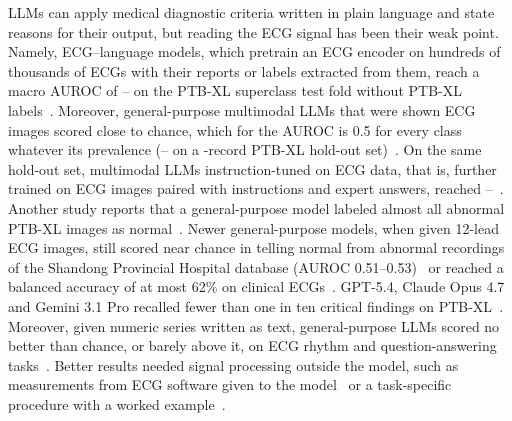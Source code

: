 LLMs can apply medical diagnostic criteria written in plain language and state reasons for their
output, but reading the ECG signal has been their weak point. Namely, ECG--language models, which pretrain an ECG encoder
on hundreds of thousands of ECGs with their reports or labels extracted from them, reach a macro AUROC of
\MinZeroShotAUROC--\BestZeroShotAUROC{} on the PTB-XL superclass test fold without PTB-XL
labels~\citep{liu2024merl,wang2025melp,pham2025dbeta,cai2025supreme}. Moreover, general-purpose multimodal LLMs that
were shown ECG images scored close to chance, which for the AUROC is 0.5 for every class whatever its prevalence
(\MinGeneralLLMAUROC--\BestGeneralLLMAUROC{} on a \NOtherTestSet-record
PTB-XL hold-out set)~\citep{liu2024teach,lan2025gem}. On the same hold-out set, multimodal LLMs instruction-tuned on ECG
data, that is, further trained on ECG images paired with instructions and expert answers, reached
\MinECGLLMAUROC--\BestECGLLMAUROC~\citep{liu2024teach,lan2025gem}. Another study reports that a general-purpose model
labeled almost all abnormal PTB-XL images as normal~\citep{seki2025assessing}. Newer general-purpose models, when given
12-lead ECG images, still scored near chance in telling normal from abnormal recordings of the Shandong Provincial
Hospital database (AUROC 0.51--0.53)~\citep{ahammad2026ecgimage} or reached a balanced accuracy of at most 62\% on
clinical ECGs~\citep{soubh2026performance}. GPT-5.4, Claude Opus 4.7 and Gemini 3.1 Pro recalled fewer than one in ten
critical findings on PTB-XL~\citep{gao2026luminaecg}. Moreover, given numeric series written as text, general-purpose LLMs scored
no better than chance, or barely above it, on ECG rhythm and question-answering
tasks~\citep{liu2025picture,langer2025opentslm}. Better results needed signal processing outside the model, such as
measurements from ECG software given to the model~\citep{yu2023zeroshot} or a task-specific procedure with a worked
example~\citep{xu2024penetrative}.

